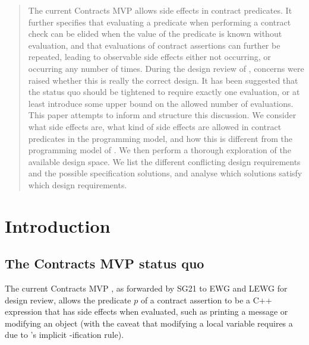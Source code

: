 \begin{abstract}
The current Contracts MVP \cite{P2900R6} allows side effects in contract predicates. It further specifies that evaluating a predicate when performing a contract check can be elided when the value of the predicate is known without evaluation, and that evaluations of contract assertions can further be repeated, leading to observable side effects either not occurring, or occurring any number of times. During the design review of \cite{P2900R6}, concerns were raised whether this is really the correct design. It has been suggested that the status quo should be tightened to require exactly one evaluation, or at least introduce some upper bound on the allowed number of evaluations. This paper attempts to inform and structure this discussion. We consider what side effects are, what kind of side effects are allowed in contract predicates in the \cite{P2900R6} programming model, and how this is different from the programming model of . We then perform a thorough exploration of the available design space. We list the different conflicting design requirements and the possible specification solutions, and analyse which solutions satisfy which design requirements.
\end{abstract}


\tableofcontents*
\pagebreak


\section{Introduction}
\label{sec:intro}

\subsection{The Contracts MVP status quo}

The current Contracts MVP \cite{P2900R6}, as forwarded by SG21 to EWG and LEWG for design review, allows the predicate $p$ of a contract assertion to be a C++ expression that has side effects when evaluated, such as printing a message or modifying an object (with the caveat that modifying a local variable requires a  due to \cite{P2900R6}'s implicit -ification rule).

